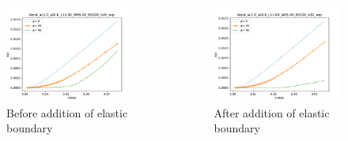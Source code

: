 \begin{frame}
\begin{columns}
\begin{column}{0.45\columnwidth}
\begin{figure}[tbp]
\centering
\includegraphics[width=\columnwidth]{before-J_CMOD_bend_ac10_at08_L1100_W0500_E0100_n20_wrp}
\caption{Before addition of elastic boundary}
\end{figure}
\end{column}
\begin{column}{0.45\columnwidth}
\begin{figure}
\centering
\includegraphics[width=\columnwidth]{after-J_CMOD_bend_ac10_at08_L1100_W0500_E0100_n20_wrp}
\caption{After addition of elastic boundary}
\end{figure}
\end{column}
\end{columns}
\note{
\vfill
}
\end{frame}

